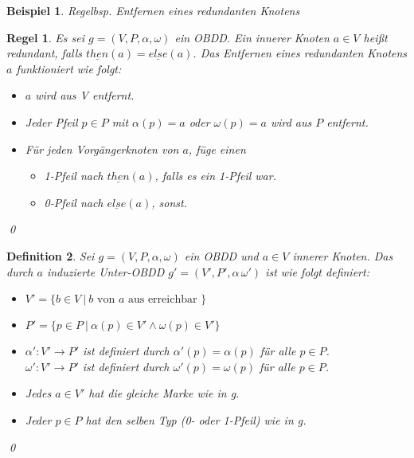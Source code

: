 \documentclass[ngerman]{scrartcl}
\theoremstyle{custom}
\newtheorem{mdef}{Definition} \numberwithin{mdef}{subsection}
\newtheorem{mr}[mdef]{Regel}
\newtheorem*{ex}{Beispiel}
\newcommand{\0}{\mathbf{0}}
\newcommand{\1}{\mathbf{L}}
\begin{document}
\begin{ex}
Regelbsp. Entfernen eines redundanten Knotens
\end{ex}

\begin{mr}\label{regel:entf}
Es sei $g=(V,P,\alpha,\omega)$ ein OBDD. Ein innerer Knoten $a \in V$
hei\ss t redundant, falls $\underline{then}(a) = \underline{else}(a)$.
Das Entfernen eines redundanten Knotens $a$ funktioniert wie folgt:
\begin{itemize}
\item[(1)] $a$ wird aus V entfernt.
\item[(2)] Jeder Pfeil $p \in P$ mit $\alpha(p) = a$ oder $\omega(p) =
  a$ wird aus $P$ entfernt.
\item[(3)] F\"ur jeden Vorg\"angerknoten von $a$, f\"uge einen
  \begin{itemize}
  \item[(i)] 1-Pfeil nach $\underline{then}(a)$, falls es ein 1-Pfeil
    war.
  \item[(ii)] 0-Pfeil nach $\underline{else}(a)$, sonst.
  \end{itemize}
\end{itemize}
\qed
\end{mr}

\begin{mdef}
Sei $g=(V,P,\alpha,\omega)$ ein OBDD und $a \in V$ innerer Knoten. Das
durch $a$ induzierte Unter-OBDD $g'=(V',P',\alpha\,\omega')$ ist wie
folgt definiert:
\begin{itemize}
\item[(1)] $V' = \{b \in V ~\vert~ b \text{ von } a \text{ aus erreichbar
  }\}$
\item[(2)] $P' = \{p \in P ~\vert~ \alpha(p) \in V' \wedge \omega(p) \in
  V'\} $
\item[(3)] $\alpha' : V' \rightarrow P'$ ist definiert durch $\alpha'(p) =
  \alpha(p)$ f\"ur alle $p \in P$.\\
  $\omega' : V' \rightarrow P'$ ist definiert durch $\omega'(p) =
  \omega(p)$ f\"ur alle $p \in P$.
\item[(4)] Jedes $a \in V'$ hat die gleiche Marke wie in g.
\item[(5)] Jeder $p \in P$ hat den selben Typ (0- oder 1-Pfeil) wie in g.
\end{itemize}
\qed
\end{mdef}
\end{document}
